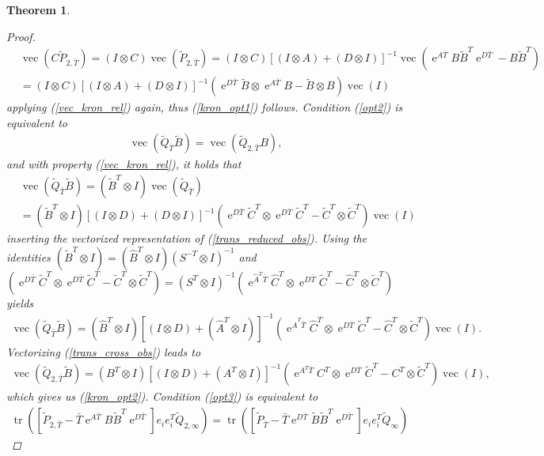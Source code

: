 \documentclass[a4paper,11pt, twoside]{article}
\newcommand{\expn}{\operatorname{e}}
\newcommand{\vect}{\operatorname{vec}}
\newcommand{\trace}{\operatorname{tr}}
\newtheorem{thm}[defn]{Theorem}
\begin{document}
\begin{thm}
\begin{proof}
\begin{align*}
 &\vect(C \tilde P_{2, \bar T})= (I\otimes C) \vect(\tilde P_{2, \bar T})= (I\otimes C)  \left[(I\otimes A)+(D\otimes 
I)\right]^{-1}\vect(\expn^{A \bar T} B \tilde B^T \expn^{D \bar T}-B \tilde B^T)\\&= (I\otimes C)  \left[(I\otimes A)+(D\otimes 
I)\right]^{-1} (\expn^{D \bar T}\tilde B \otimes \expn^{ 
A \bar T} B -\tilde B \otimes B) \vect(I)
\end{align*}
applying (\ref{vec_kron_rel}) again, thus (\ref{kron_opt1}) follows. Condition (\ref{opt2}) is equivalent to \begin{align*}
 \vect(\tilde Q_{\bar T}\tilde B)  =  \vect(\tilde Q_{2, \bar T} B),
\end{align*}
and with property (\ref{vec_kron_rel}), it holds that \begin{align*}
  &\vect(\tilde Q_{\bar T}\tilde B)=(\tilde B^T\otimes I) \vect(\tilde Q_{\bar T})\\&=(\tilde B^T\otimes I) \left[(I\otimes D)+(D\otimes 
I)\right]^{-1}(\expn^{D \bar T}\tilde C^T \otimes \expn^{D \bar T}\tilde C^T-\tilde C^T \otimes \tilde C^T)\vect(I)
                    \end{align*}
inserting the vectorized representation of (\ref{trans_reduced_obs}). Using the identities $(\tilde B^T\otimes I)= (\hat B^T\otimes I)(S^{-T}\otimes 
I)^{-1}$ and $(\expn^{D \bar T}\tilde C^T \otimes \expn^{D \bar T}\tilde C^T -\tilde C^T \otimes \tilde C^T)=(S^{T} \otimes I)^{-1} (\expn^{\hat A^T 
\bar T}\hat C^T \otimes \expn^{D \bar T}\tilde C^T -\hat C^T \otimes \tilde C^T)$ yields
\begin{align*}
  \vect(\tilde Q_{\bar T}\tilde B)=(\hat B^T\otimes I) \left[(I\otimes D)+(\hat A^T\otimes 
I)\right]^{-1}(\expn^{\hat A^T \bar T}\hat C^T \otimes \expn^{D \bar T}\tilde C^T-\hat C^T \otimes \tilde C^T)\vect(I).
 \end{align*}
Vectorizing (\ref{trans_cross_obs}) leads to \begin{align*}
  \vect(\tilde Q_{2, \bar T}\tilde B)=(B^T\otimes I) \left[(I\otimes D)+(A^T\otimes I)\right]^{-1}(\expn^{A^T \bar T} C^T \otimes \expn^{D 
\bar T}\tilde C^T-C^T \otimes \tilde C^T)\vect(I),
                    \end{align*}
 which gives us (\ref{kron_opt2}). Condition (\ref{opt3}) is equivalent to \begin{align*}
\trace([\tilde P_{2, {\bar T}}-\bar T \expn^{A \bar T}B \tilde B^T \expn^{D \bar T}]e_i e_i^T\tilde Q_{2, \infty})=
\trace([\tilde P_{\bar T}-\bar T\expn^{D \bar T}\tilde B \tilde B^T \expn^{D \bar T}]e_i e_i^T\tilde Q_{\infty})

\end{align*}
\end{proof}
\end{thm}
\end{document}
